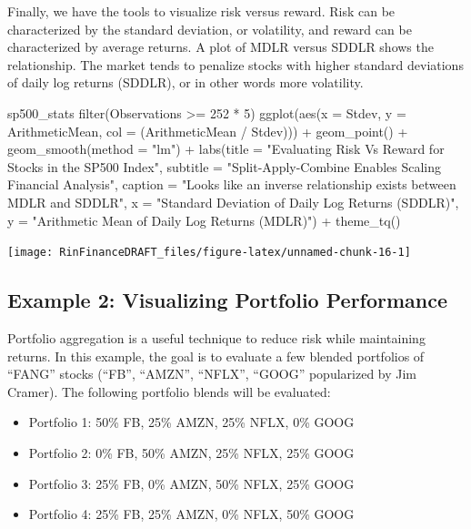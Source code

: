 Finally, we have the tools to visualize risk versus reward. Risk can be
characterized by the standard deviation, or volatility, and reward can
be characterized by average returns. A plot of MDLR versus SDDLR shows
the relationship. The market tends to penalize stocks with higher
standard deviations of daily log returns (SDDLR), or in other words more
volatility.

\begin{Schunk}
\begin{Sinput}
sp500_stats %
    filter(Observations >= 252 * 5) %
    ggplot(aes(x = Stdev, y = ArithmeticMean, col = (ArithmeticMean / Stdev))) +
    geom_point() +
    geom_smooth(method = "lm") +
    labs(title = "Evaluating Risk Vs Reward for Stocks in the SP500 Index",
         subtitle = "Split-Apply-Combine Enables Scaling Financial Analysis",
         caption = "Looks like an inverse relationship exists between MDLR and SDDLR",
         x = "Standard Deviation of Daily Log Returns (SDDLR)",
         y = "Arithmetic Mean of Daily Log Returns (MDLR)") +
    theme_tq()
\end{Sinput}


\begin{center}\texttt{[image: RinFinanceDRAFT\_files/figure-latex/unnamed-chunk-16-1]} \end{center}

\end{Schunk}

\subsection{Example 2: Visualizing Portfolio
Performance}\label{example-2-visualizing-portfolio-performance}

Portfolio aggregation is a useful technique to reduce risk while
maintaining returns. In this example, the goal is to evaluate a few
blended portfolios of ``FANG'' stocks (``FB'', ``AMZN'', ``NFLX'',
``GOOG'' popularized by Jim Cramer). The following portfolio blends will
be evaluated:

\begin{itemize}
\tightlist
\item
  Portfolio 1: 50\% FB, 25\% AMZN, 25\% NFLX, 0\% GOOG
\item
  Portfolio 2: 0\% FB, 50\% AMZN, 25\% NFLX, 25\% GOOG
\item
  Portfolio 3: 25\% FB, 0\% AMZN, 50\% NFLX, 25\% GOOG
\item
  Portfolio 4: 25\% FB, 25\% AMZN, 0\% NFLX, 50\% GOOG
\end{itemize}


